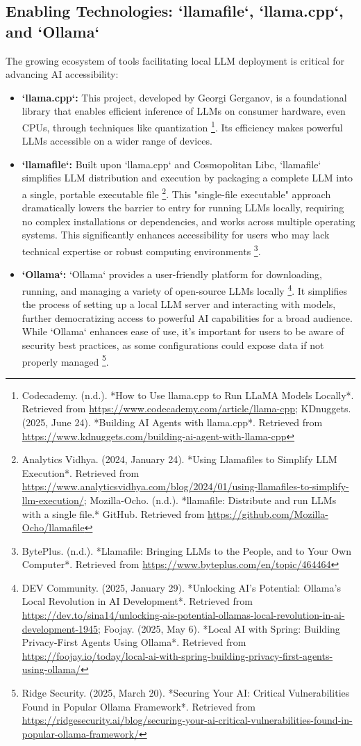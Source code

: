 \subsection{Enabling Technologies: `llamafile`, `llama.cpp`, and `Ollama`}
The growing ecosystem of tools facilitating local LLM deployment is critical for advancing AI accessibility:
\begin{itemize}
    \item \textbf{`llama.cpp`:} This project, developed by Georgi Gerganov, is a foundational library that enables efficient inference of LLMs on consumer hardware, even CPUs, through techniques like quantization \footnote{Codecademy. (n.d.). *How to Use llama.cpp to Run LLaMA Models Locally*. Retrieved from \url{https://www.codecademy.com/article/llama-cpp}; KDnuggets. (2025, June 24). *Building AI Agents with llama.cpp*. Retrieved from \url{https://www.kdnuggets.com/building-ai-agent-with-llama-cpp}}. Its efficiency makes powerful LLMs accessible on a wider range of devices.
    \item \textbf{`llamafile`:} Built upon `llama.cpp` and Cosmopolitan Libc, `llamafile` simplifies LLM distribution and execution by packaging a complete LLM into a single, portable executable file \footnote{Analytics Vidhya. (2024, January 24). *Using Llamafiles to Simplify LLM Execution*. Retrieved from \url{https://www.analyticsvidhya.com/blog/2024/01/using-llamafiles-to-simplify-llm-execution/}; Mozilla-Ocho. (n.d.). *llamafile: Distribute and run LLMs with a single file.* GitHub. Retrieved from \url{https://github.com/Mozilla-Ocho/llamafile}}. This "single-file executable" approach dramatically lowers the barrier to entry for running LLMs locally, requiring no complex installations or dependencies, and works across multiple operating systems. This significantly enhances accessibility for users who may lack technical expertise or robust computing environments \footnote{BytePlus. (n.d.). *Llamafile: Bringing LLMs to the People, and to Your Own Computer*. Retrieved from \url{https://www.byteplus.com/en/topic/464464}}.
    \item \textbf{`Ollama`:} `Ollama` provides a user-friendly platform for downloading, running, and managing a variety of open-source LLMs locally \footnote{DEV Community. (2025, January 29). *Unlocking AI's Potential: Ollama's Local Revolution in AI Development*. Retrieved from \url{https://dev.to/sina14/unlocking-ais-potential-ollamas-local-revolution-in-ai-development-1945}; Foojay. (2025, May 6). *Local AI with Spring: Building Privacy-First Agents Using Ollama*. Retrieved from \url{https://foojay.io/today/local-ai-with-spring-building-privacy-first-agents-using-ollama/}}. It simplifies the process of setting up a local LLM server and interacting with models, further democratizing access to powerful AI capabilities for a broad audience. While `Ollama` enhances ease of use, it's important for users to be aware of security best practices, as some configurations could expose data if not properly managed \footnote{Ridge Security. (2025, March 20). *Securing Your AI: Critical Vulnerabilities Found in Popular Ollama Framework*. Retrieved from \url{https://ridgesecurity.ai/blog/securing-your-ai-critical-vulnerabilities-found-in-popular-ollama-framework/}}.
\end{itemize}
